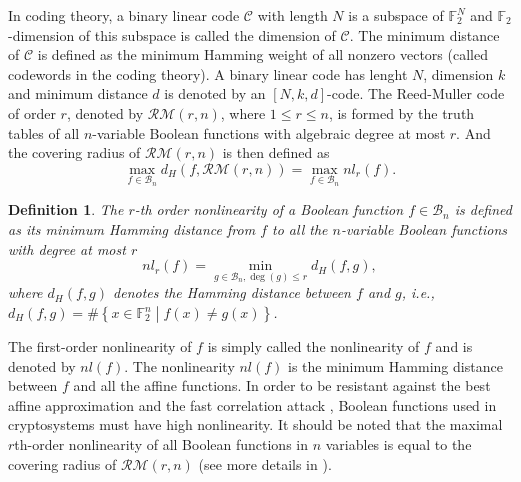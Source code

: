 \documentclass{article}
\newcommand{\F}{\mathbb{F}}
\newcommand{\0}{\textbf{0}}
\newcommand{\1}{\textbf{1}}
\theoremstyle{plain}
\newtheorem{definition}{Definition}
\begin{document}
    In coding theory, a binary linear code $\mathcal{C}$ with length $N$ is a subspace of $\F_2^N$ and $\F_2$-dimension of this subspace is called the dimension of $\mathcal{C}$. 
    The minimum distance of $\mathcal{C}$ is defined as the minimum Hamming weight of all nonzero vectors (called codewords in the coding theory). 
    A binary linear code has lenght $N$, dimension $k$ and minimum distance $d$ is denoted by an $\left[ N,k,d \right]$-code. 
    The Reed-Muller code of order $r$, denoted by $\mathcal{RM}(r,n)$, where $1\le r\le n$, is formed by the truth tables of all $n$-variable Boolean functions with algebraic degree at most $r$. 
    And the covering radius of $\mathcal{RM}(r,n)$ is then defined as 
    \[\max_{f\in\mathcal{B}_n}d_H(f,\mathcal{RM}(r,n))=\max_{f\in \mathcal{B}_n}nl_r(f).\]

    \begin{definition}
        The $r$-th order nonlinearity of a Boolean function $f\in\mathcal{B}_n$ is defined as its minimum Hamming distance from $f$ to all the $n$-variable Boolean functions with degree at most $r$
        \[nl_r(f)=\min_{g\in\mathcal{B}_n,\deg(g)\le r} d_H(f,g),\]
        where $d_H(f,g)$ denotes the Hamming distance between $f$ and $g$, i.e., $d_H(f,g)=\#\left\{ x\in\F_2^n\middle|f(x)\ne g(x) \right\}$.
    \end{definition}
    The first-order nonlinearity of $f$ is simply called the nonlinearity of $f$ and is denoted by $nl(f)$. 
    The nonlinearity $nl(f)$ is the minimum Hamming distance between $f$ and all the affine functions. 
    In order to be resistant against the best affine approximation \cite{DingXS1991book} and the fast correlation attack \cite{MS1988fast_correlation_attack}, Boolean functions used in cryptosystems must have high nonlinearity. 
    It should be noted that the maximal $r$th-order nonlinearity of all Boolean functions in $n$ variables is equal to the covering radius of $\mathcal{RM}(r, n)$ (see more details in \cite{CohenHLL1997RMcodecover}). 
\end{document}
